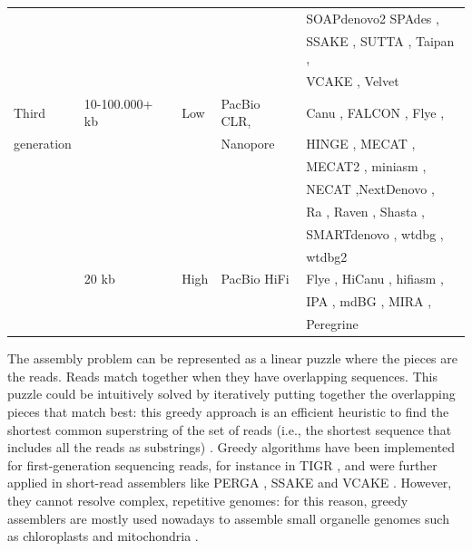 \begin{table}
\begin{tabular}{|l|l|l|l|l|}
        &  &  &  & SOAPdenovo2 \cite{soapdenovo2} SPAdes \cite{spades}, \\
        &  &  &  & SSAKE \cite{ssake}, SUTTA \cite{sutta}, Taipan \cite{taipan}, \\
        &  &  &  & VCAKE \cite{vcake}, Velvet \cite{velvet} \\
    \hline
    Third & 10-100.000+ kb & Low & PacBio CLR, & Canu \cite{canu}, FALCON \cite{falcon-unzip}, Flye \cite{flye}, \\
    generation &  &  & Nanopore & HINGE \cite{hinge}, MECAT \cite{mecat}, \\
        &  &  &  & MECAT2 \cite{mecat}, miniasm \cite{miniasm}, \\
        &  &  &  & NECAT \cite{necat},NextDenovo \cite{nextdenovo}, \\
        &  &  &  & Ra \cite{ra}, Raven \cite{raven}, Shasta \cite{shasta}, \\
        &  &  &  & SMARTdenovo \cite{smartdenovo}, wtdbg \cite{wtdbg}, \\
        &  &  &  & wtdbg2 \cite{wtdbg2} \\
        & 20 kb & High & PacBio HiFi & Flye \cite{flye}, HiCanu \cite{hicanu}, hifiasm \cite{hifiasm}, \\ 
        &  &  &  & IPA \cite{IPA}, mdBG \cite{mdbg}, MIRA \cite{mira}, \\
        &  &  &  & Peregrine \cite{peregrine}\\
    \hline
\end{tabular}
\label{tab:sequencing}
\end{table}


The assembly problem can be represented as a linear puzzle where the pieces are the reads. Reads match together when they have overlapping sequences. This puzzle could be intuitively solved by iteratively putting together the overlapping pieces that match best: this greedy approach is an efficient heuristic to find the shortest common superstring of the set of reads (i.e., the shortest sequence that includes all the reads as substrings) \cite{greedy}. Greedy algorithms have been implemented for first-generation sequencing reads, for instance in TIGR \cite{tigr}, and were further applied in short-read assemblers like PERGA \cite{perga}, SSAKE \cite{ssake} and VCAKE \cite{vcake}. However, they cannot resolve complex, repetitive genomes: for this reason, greedy assemblers are mostly used nowadays to assemble small organelle genomes such as chloroplasts and mitochondria \cite{novoplasty}. \\

